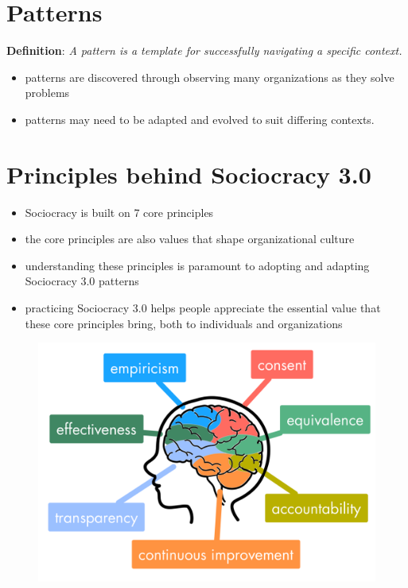 \chapter{Patterns}
\label{patterns}

\textbf{Definition}: \emph{A pattern is a template for successfully navigating a specific context.}

\begin{itemize}
\item patterns are discovered through observing many organizations as they solve problems

\item patterns may need to be adapted and evolved to suit differing contexts.

\end{itemize}

\chapter{Principles behind Sociocracy 3.0}
\label{principlesbehindsociocracy3.0}

\begin{itemize}
\item Sociocracy is built on 7 core principles

\item the core principles are also values that shape organizational culture

\item understanding these principles is paramount to adopting and adapting Sociocracy 3.0 patterns

\item practicing Sociocracy 3.0 helps people appreciate the essential value that these core principles bring, both to individuals and organizations

\end{itemize}

\begin{figure}[htbp]
\centering
\includegraphics[keepaspectratio,width=\textwidth,height=0.75\textheight]{img/principles/s3-principles-v3a.png}
\end{figure}


